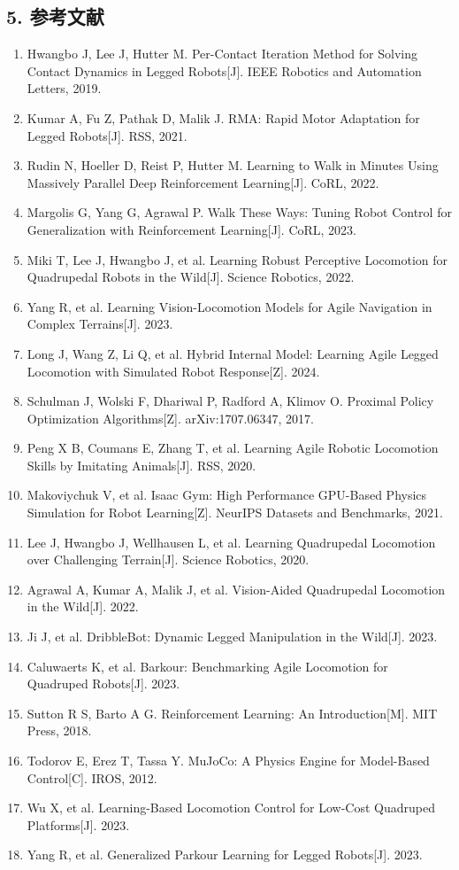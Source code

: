 \documentclass[12pt,a4paper]{ctexart}
\begin{document}
\subsection*{5. 参考文献}
\begin{enumerate}
  \item Hwangbo J, Lee J, Hutter M. Per-Contact Iteration Method for Solving Contact Dynamics in Legged Robots[J]. IEEE Robotics and Automation Letters, 2019.
  \item Kumar A, Fu Z, Pathak D, Malik J. RMA: Rapid Motor Adaptation for Legged Robots[J]. RSS, 2021.
  \item Rudin N, Hoeller D, Reist P, Hutter M. Learning to Walk in Minutes Using Massively Parallel Deep Reinforcement Learning[J]. CoRL, 2022.
  \item Margolis G, Yang G, Agrawal P. Walk These Ways: Tuning Robot Control for Generalization with Reinforcement Learning[J]. CoRL, 2023.
  \item Miki T, Lee J, Hwangbo J, et al. Learning Robust Perceptive Locomotion for Quadrupedal Robots in the Wild[J]. Science Robotics, 2022.
  \item Yang R, et al. Learning Vision-Locomotion Models for Agile Navigation in Complex Terrains[J]. 2023.
  \item Long J, Wang Z, Li Q, et al. Hybrid Internal Model: Learning Agile Legged Locomotion with Simulated Robot Response[Z]. 2024.
  \item Schulman J, Wolski F, Dhariwal P, Radford A, Klimov O. Proximal Policy Optimization Algorithms[Z]. arXiv:1707.06347, 2017.
  \item Peng X B, Coumans E, Zhang T, et al. Learning Agile Robotic Locomotion Skills by Imitating Animals[J]. RSS, 2020.
  \item Makoviychuk V, et al. Isaac Gym: High Performance GPU-Based Physics Simulation for Robot Learning[Z]. NeurIPS Datasets and Benchmarks, 2021.
  \item Lee J, Hwangbo J, Wellhausen L, et al. Learning Quadrupedal Locomotion over Challenging Terrain[J]. Science Robotics, 2020.
  \item Agrawal A, Kumar A, Malik J, et al. Vision-Aided Quadrupedal Locomotion in the Wild[J]. 2022.
  \item Ji J, et al. DribbleBot: Dynamic Legged Manipulation in the Wild[J]. 2023.
  \item Caluwaerts K, et al. Barkour: Benchmarking Agile Locomotion for Quadruped Robots[J]. 2023.
  \item Sutton R S, Barto A G. Reinforcement Learning: An Introduction[M]. MIT Press, 2018.
  \item Todorov E, Erez T, Tassa Y. MuJoCo: A Physics Engine for Model-Based Control[C]. IROS, 2012.
  \item Wu X, et al. Learning-Based Locomotion Control for Low-Cost Quadruped Platforms[J]. 2023.
  \item Yang R, et al. Generalized Parkour Learning for Legged Robots[J]. 2023.
\end{enumerate}
\end{document}

